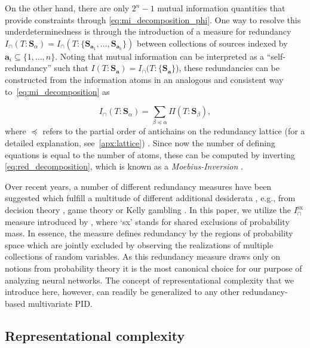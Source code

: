 \documentclass[10pt]{article}
\renewcommand\autoref[1]{\cref{#1}}
\theoremstyle{definition}
\theoremstyle{plain}
\begin{document}
On the other hand, there are only $2^n-1$ mutual information quantities that provide constraints through \autoref{eq:mi_decomposition_phi}. One way to resolve this underdeterminedness is through the introduction of a measure for redundancy \mbox{$I_\cap(T: \bm S_\alpha) = I_\cap(T: \{\bm S_{\bm a_1}, \dots, \bm S_{\bm a_k}\})$} between collections of sources indexed by $\bm a_i \subseteq \{1, \dots, n\}$. Noting that mutual information can be interpreted as a ``self-redundancy'' such that $I(T:\bm{S}_{\bm{a}}) = I_\cap(T:\{\bm{S}_{\bm{a}}\}$), these redundancies can be constructed from the information atoms in an analogous and consistent way to~\autoref{eq:mi_decomposition} as

\begin{equation}
    I_\cap(T: \bm S_\alpha) = \sum_{\beta \preceq \alpha} \Pi(T:\bm S_\beta),
    \label{eq:red_decomposition}
\end{equation}
where $\preceq$ refers to the partial order of antichains on the redundancy lattice (for a detailed explanation, see~\autoref{apx:lattice}) \citep{crampton2000two, crampton2001completion, williams_nonnegative_2010}. Since now the number of defining equations is equal to the number of atoms, these can be computed by inverting \autoref{eq:red_decomposition}, which is known as a \textit{Moebius-Inversion} \citep{rota1964foundations, williams_nonnegative_2010}.

Over recent years, a number of different redundancy measures have been suggested which fulfill a multitude of different additional desiderata \citep{lizier2018information}, e.g., from decision theory \citep{bertschinger_quantifying_2014}, game theory \citep{ince_measuring_2017} or Kelly gambling \citep{finn_pointwise_2018}. In this paper, we utilize the $I^{\mathrm{sx}}_\cap$ measure introduced by \citet{makkeh_introducing_2021}, where `sx' stands for shared exclusions of probability mass. In essence, the measure defines redundancy by the regions of probability space which are jointly excluded by observing the realizations of multiple collections of random variables. As this redundancy measure draws only on notions from probability theory it is the most canonical choice for our purpose of analyzing neural networks. The concept of representational complexity that we introduce here, however, can readily be generalized to any other redundancy-based multivariate PID.

\subsection{Representational complexity}
\end{document}
